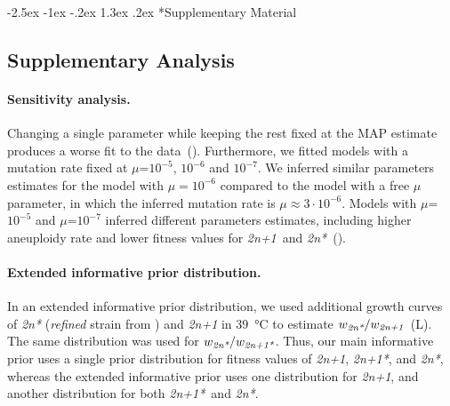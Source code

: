 \documentclass[12pt]{extarticle}
\makeatletter
\renewcommand\section{\@startsection {section}{1}{\z@}%
     {-2.5ex \@plus -1ex \@minus -.2ex}%
     {1.3ex \@plus.2ex}%
    {\Large\bfseries}}
\newcommand{\anwt}{\emph{2n+1}}
\newcommand{\eumt}{\emph{2n*}}
\newcommand{\anmt}{\emph{2n+1*}}
\newcommand{\beginsupplement}{%
      	\setcounter{table}{0}
        \renewcommand{\thetable}{S\arabic{table}}%
        \setcounter{figure}{0}
        \renewcommand{\thefigure}{S\arabic{figure}}%
}
\makeatother
\begin{document}
\newpage

\section*{Supplementary Material}
\beginsupplement %

\subsection*{Supplementary Analysis}
\label{sec:supp_analysis}

\paragraph*{Sensitivity analysis.} 
Changing a single parameter while keeping the rest fixed at the MAP estimate produces a worse fit to the data~().
Furthermore, we fitted models with a mutation rate fixed at $\mu$=$10^{-5}$, $10^{-6}$ and $10^{-7}$.
We inferred similar parameters estimates for the model with $\mu=10^{-6}$ compared to the model with a free $\mu$ parameter, in which the inferred mutation rate is $\mu \approx 3\cdot10^{-6}$.
Models with $\mu$=$10^{-5}$ and $\mu$=$10^{-7}$ inferred different parameters estimates, including higher aneuploidy rate and lower fitness values for \anwt\ and \eumt~().

\paragraph*{Extended informative prior distribution.}
In an extended informative prior distribution, we used additional growth curves of \eumt\; (\emph{refined} strain from \citet{Yona2012}) and \anwt\; in \SI{39}{\celsius} to estimate $w_{\eumt}/w_{\anwt}$~(L). The same distribution was used for $w_{\eumt}/w_{\anmt}$. 
Thus, our main informative prior uses a single prior distribution for fitness values of \anwt, \anmt, and \eumt, whereas the extended informative prior uses one distribution for \anwt, and another distribution for both \anmt\ and \eumt. 
\end{document}
